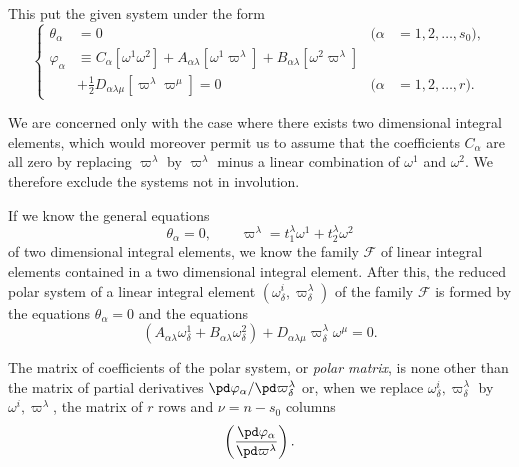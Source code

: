 This put the given system under the form
\begin{equation}
  \label{eq:5.2}
  \left\{
    \begin{aligned}
      \theta_{\alpha}&= 0&(\alpha&=1,2,\dots,s_{0}),\\
      \varphi_{\alpha}&\equiv C_{\alpha}[\omega^{1}\omega^{2}]+A_{\alpha\lambda}[\omega^{1}\varpi^{\lambda}]+B_{\alpha\lambda}[\omega^{2}\varpi^{\lambda}]\\
      &+\frac{1}{2}D_{\alpha\lambda\mu}[\varpi^{\lambda}\varpi^{\mu}]=0&(\alpha&=1,2,\dots,r).
    \end{aligned}
  \right.
\end{equation}

We are concerned only with the case where there exists two dimensional integral elements, which would moreover permit us to assume that the coefficients $C_{\alpha}$ are all zero by replacing $\varpi^{\lambda}$ by $\varpi^{\lambda}$ minus a linear combination of $\omega^{1}$ and $\omega^{2}$. We therefore exclude the systems not in involution.

If we know the general equations
\begin{equation}
  \label{eq:5.3}
  \theta_{\alpha}=0,\qquad\varpi^{\lambda}=t_{1}^{\lambda}\omega^{1}+t_{2}^{\lambda}\omega^{2}
\end{equation}
of two dimensional integral elements, we know the family $\mathcal{F}$ of linear integral elements contained in a two dimensional integral element. After this, the reduced polar system of a linear integral element $(\omega^{i}_{\delta},\varpi^{\lambda}_{\delta})$ of the family $\mathcal{F}$ is formed by the equations $\theta_{\alpha}=0$ and the equations
\begin{equation}
  \label{eq:5.4}
  (A_{\alpha\lambda}\omega^{1}_{\delta}+B_{\alpha\lambda}\omega^{2}_{\delta})+D_{\alpha\lambda\mu}\varpi^{\lambda}_{\delta}\omega^{\mu}=0.
\end{equation}

The matrix of coefficients of the polar system, or \emph{polar matrix}, is none other than the matrix of partial derivatives $\pd \varphi_{\alpha}/\pd \varpi^{\lambda}_{\delta}$ or, when we replace $\omega^{i}_{\delta},\varpi^{\lambda}_{\delta}$ by $\omega^{i},\varpi^{\lambda}$, the matrix of $r$ rows and $\nu=n-s_{0}$ columns
\begin{equation}
  \label{eq:5.5}
  \left(\frac{\pd \varphi_{\alpha}}{\pd \varpi^{\lambda}}\right).
\end{equation}

